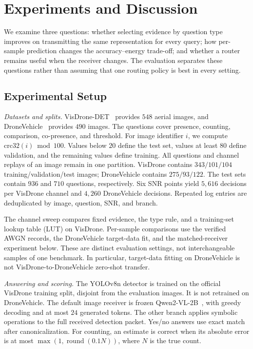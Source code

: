 \section{Experiments and Discussion}\label{sec:exp}
We examine three questions: whether selecting evidence by question type
improves on transmitting the same representation for every query;
how per-sample prediction changes the accuracy--energy trade-off;
and whether a router remains useful when the receiver changes.
The evaluation separates these questions rather than assuming that
one routing policy is best in every setting.

\subsection{Experimental Setup}\label{subsec:setup}\label{subsec:tasks}
\emph{Datasets and splits.}
VisDrone-DET~\cite{zhu2021visdrone} provides $548$ aerial images,
and DroneVehicle~\cite{sun2022dronevehicle} provides $490$ images.
The questions cover presence, counting, comparison, co-presence,
and threshold. For image identifier $i$, we compute
$\mathrm{crc32}(i)\bmod100$. Values below $20$ define the test set,
values at least $80$ define validation, and the remaining values
define training. All questions and channel replays of an image
remain in one partition. VisDrone contains $343/101/104$
training/validation/test images; DroneVehicle contains $275/93/122$.
The test sets contain $936$ and $710$ questions, respectively.
Six SNR points yield $5{,}616$ decisions per VisDrone channel and
$4{,}260$ DroneVehicle decisions. Repeated log entries are deduplicated
by image, question, SNR, and branch.

The channel sweep compares fixed evidence, the type rule, and a
training-set lookup table (LUT) on VisDrone. Per-sample comparisons
use the verified AWGN records, the DroneVehicle target-data fit,
and the matched-receiver experiment below. These are distinct
evaluation settings, not interchangeable samples of one benchmark.
In particular, target-data fitting on DroneVehicle is not
VisDrone-to-DroneVehicle zero-shot transfer.

\emph{Answering and scoring.}
The YOLOv8n detector is trained on the official VisDrone training
split, disjoint from the evaluation images. It is not retrained on
DroneVehicle. The default image receiver is frozen
Qwen2-VL-2B~\cite{wang2024qwen2vl}, with greedy decoding and at most
$24$ generated tokens. The other branch applies symbolic operations
to the full received detection packet. Yes/no answers use exact
match after canonicalization. For counting, an estimate is correct
when its absolute error is at most
$\max(1,\operatorname{round}(0.1N))$, where $N$ is the true count.

